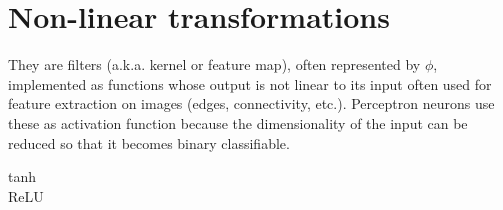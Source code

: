
\section{Non-linear transformations}
\label{sec:Non-linear transformations}

They are filters (a.k.a. kernel or feature map), often represented by $\phi$, implemented as functions whose output is not linear to its input often used for feature extraction on images (edges, connectivity, etc.). Perceptron neurons use these as activation function because the dimensionality of the input can be reduced so that it becomes binary classifiable.

\begin{description}
  \item[tanh]
  \item[ReLU]
\end{description}
